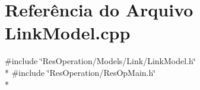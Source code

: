 \section{Referência do Arquivo Link\+Model.\+cpp}
\label{_link_model_8cpp}
{\ttfamily \#include \char`\"{}Res\+Operation/\+Models/\+Link/\+Link\+Model.\+h\char`\"{}}\\*
{\ttfamily \#include \char`\"{}Res\+Operation/\+Res\+Op\+Main.\+h\char`\"{}}\\*
